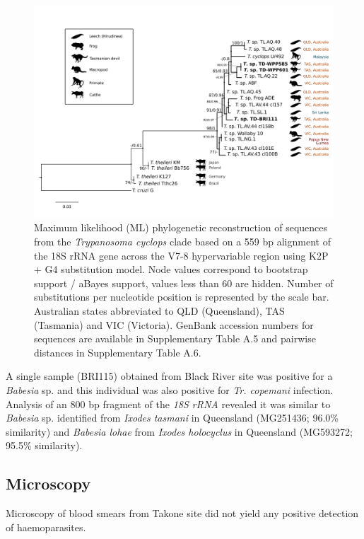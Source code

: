 \documentclass[a4paper, nobind]{templates/ociamthesis}
\begin{document}
\begin{figure}
\includegraphics[width=0.95\linewidth]{figures/ms-figs/Ch6-Fig4} \caption[Phylogenetic tree of \textit{Tr. cyclops} clade (\textit{18S rRNA}, v7-8 region) from the Tasmanian devil.]{Maximum likelihood (ML) phylogenetic reconstruction of sequences from the \textit{Trypanosoma cyclops} clade based on a 559 bp alignment of the 18S rRNA gene across the V7-8 hypervariable region using K2P + G4 substitution model. Node values correspond to bootstrap support / aBayes support, values less than 60 are hidden. Number of substitutions per nucleotide position is represented by the scale bar. Australian states abbreviated to QLD (Queensland), TAS (Tasmania) and VIC (Victoria). GenBank accession numbers for sequences are available in Supplementary Table A.5 and pairwise distances in Supplementary Table A.6.}\label{fig:F64}
\end{figure}

A single sample (BRI115) obtained from Black River site was positive for a \emph{Babesia} sp. and this individual was also positive for \emph{Tr. copemani} infection. Analysis of an 800 bp fragment of the \emph{18S rRNA} revealed it was similar to \emph{Babesia} sp. identified from \emph{Ixodes tasmani} in Queensland (MG251436; 96.0\% similarity) and \emph{Babesia lohae} from \emph{Ixodes holocyclus} in Queensland (MG593272; 95.5\% similarity).

\hypertarget{microscopy}{%
\subsection{Microscopy}\label{microscopy}}

Microscopy of blood smears from Takone site did not yield any positive detection of haemoparasites.
\end{document}
